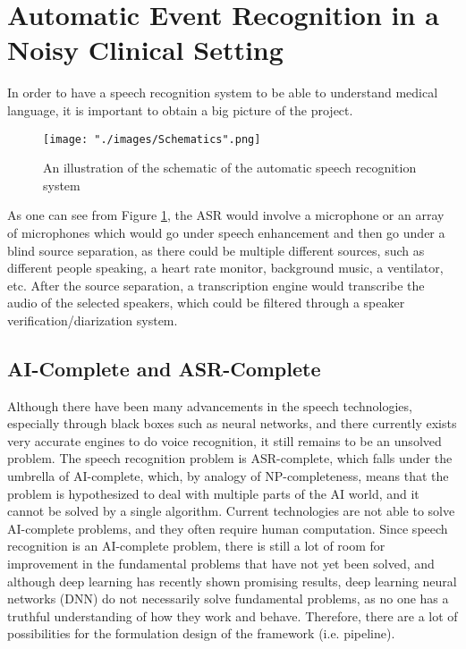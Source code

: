 \section{Automatic Event Recognition in a Noisy Clinical Setting}

In order to have a speech recognition system to be able to understand medical language, it is important to obtain a big picture of the project.

\begin{figure}[H]
\begin{center}
    \texttt{[image: "./images/Schematics".png]}
    \caption{An illustration of the schematic of the automatic speech recognition system}
    \label{fig::schematics}
\end{center}
\end{figure}

As one can see from Figure \ref{fig::schematics}, the ASR would involve a microphone or an array of microphones which would go under speech enhancement and then go under a blind source separation, as there could be multiple different sources, such as different people speaking, a heart rate monitor, background music, a ventilator, etc. After the source separation, a transcription engine would transcribe the audio of the selected speakers, which could be filtered through a speaker verification/diarization system.

\subsection{AI-Complete and ASR-Complete}
Although there have been many advancements in the speech technologies, especially through black boxes such as neural networks, and there currently exists very accurate engines to do voice recognition, it still remains to be an unsolved problem. The speech recognition problem is ASR-complete, which falls under the umbrella of AI-complete, which, by analogy of NP-completeness, means that the problem is hypothesized to deal with multiple parts of the AI world, and it cannot be solved by a single algorithm. Current technologies are not able to solve AI-complete problems, and they often require human computation. Since speech recognition is an AI-complete problem, there is still a lot of room for improvement in the fundamental problems that have not yet been solved, and although deep learning has recently shown promising results, deep learning neural networks (DNN) do not necessarily solve fundamental problems, as no one has a truthful understanding of how they work and behave. Therefore, there are a lot of possibilities for the formulation design of the framework (i.e. pipeline).

